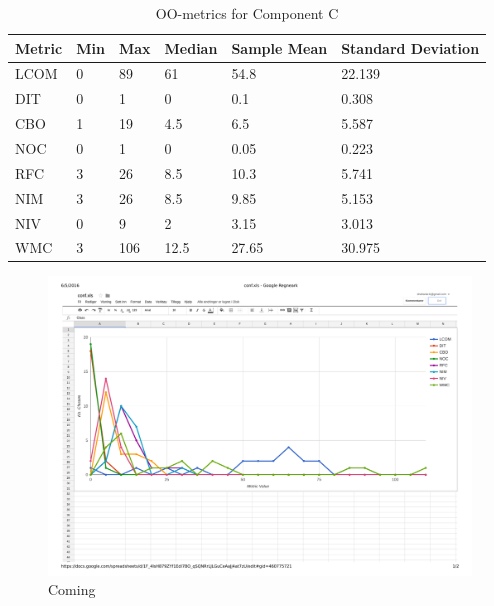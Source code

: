 \begin{table}[]
\centering
\caption{OO-metrics for Component C}
\label{tab:oometrics-config}
\begin{tabular}{|l|l|l|l|l|l|}
\hline
\textbf{Metric} & \textbf{Min} & \textbf{Max} & \textbf{Median} & \textbf{Sample Mean} & \textbf{Standard Deviation} \\ \hline
LCOM            & 0            & 89           & 61              & 54.8                 & 22.139                       \\ \hline
DIT             & 0            & 1            & 0               & 0.1                  & 0.308                       \\ \hline
CBO             & 1            & 19           & 4.5               & 6.5                 & 5.587                       \\ \hline
NOC             & 0            & 1            & 0               & 0.05                    & 0.223                           \\ \hline
RFC             & 3            & 26           & 8.5             & 10.3                 & 5.741                       \\ \hline
NIM             & 3            & 26           & 8.5             & 9.85                 & 5.153                       \\ \hline
NIV             & 0            & 9            & 2               & 3.15                 & 3.013                       \\ \hline
WMC           & 3            & 106          & 12.5              & 27.65                 & 30.975                      \\ \hline
\end{tabular}
\end{table}



\begin{landscape}
\setlength\LTleft{-.5in}
	\begin{figure}
	\centering
	\includegraphics[width=\textwidth]{images/pdf/conf.pdf}
	\caption{Coming}
	\label{fig:confgraph}
	\end{figure}
\end{landscape}


